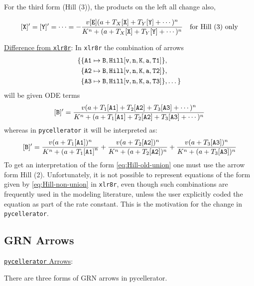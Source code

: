 For the third form (Hill (3)), the products on the left all change also, 

\begin{align}
&{\tt [X]'}={\tt[Y]'}=\cdots =  -\dfrac{v {\tt [E]} ( a + T_X{\tt [X]} + T_Y{\tt [Y]}+ \cdots )^n}{K^n + (a + T_X{\tt [X]} + T_Y{\tt [Y]} + \cdots)^n} & \text{for Hill (3) only}
\end{align}


\underline{Difference from {\tt xlr8r}}: In {\tt xlr8r} the combination of arrows
\begin{equation}
\begin{split}
\{ & \{ {\tt A1} \mapsto {\tt B}, {\tt Hill[v, n, K, a, T1]}\}, \\
   & \{ {\tt A2} \mapsto {\tt B}, {\tt Hill[v, n, K, a, T2]}\}, \\
   & \{ {\tt A3} \mapsto {\tt B}, {\tt Hill[v, n, K, a, T3]}\},    
   \dots \}
\end{split}
\end{equation}
will be given ODE terms
\begin{equation}\label{eq:Hill-old-union}
{\tt [B]'} = \dfrac{v  ( a + T_1 {\tt [A1]} +T_2 {\tt [A2]} + T_3 {\tt [A3]} + \cdots )^n}{K^n + (a + T_1 {\tt [A1]} +T_2 {\tt [A2]} + T_3 {\tt [A3]} + \cdots )^n}
\end{equation}
whereas in {\tt pycellerator} it will be interpreted as:
\begin{equation} \label{eq:Hill-non-union}
{\tt [B]'} = \dfrac{v  ( a +T_1 {\tt [A1]})^n}{K^n + (a+ T_1 {\tt [A1]}^n}
           + \dfrac{v  ( a+ T_2 {\tt [A2]})^n}{K^n + (a+T_2 {\tt [A2]})^n} 
           + \dfrac{v  ( a +T_3 {\tt [A3]})^n}{K^n + (a+ T_3 {\tt [A3]})^n}
\end{equation}
To get an interpretation of the form \eqref{eq:Hill-old-union} one must use the arrow form Hill  (2). Unfortunately, it is not possible to represent equations of the form given by \eqref{eq:Hill-non-union} in {\tt xlr8r}, even though such combinations are frequently used in the modeling literature, unless the user explicitly coded the equation as part of the rate constant. This is the motivation for the change in {\tt pycellerator}. 



\subsection{GRN Arrows}
\label{section:GRN}
\underline{{\tt pycellerator} Arrows}:

There are three forms of GRN arrows in pycellerator. 

